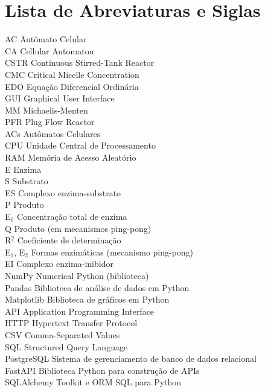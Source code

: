 \documentclass[12pt,oneside]{report}
\begin{document}
\chapter*{Lista de Abreviaturas e Siglas}
\begin{tabbing}
    AC \hspace{2cm} \= Autômato Celular \\
    CA \> Cellular Automaton \\
    CSTR \> Continuous Stirred-Tank Reactor \\
    CMC \> Critical Micelle Concentration \\
    EDO \> Equação Diferencial Ordinária \\
    GUI \> Graphical User Interface \\
    MM \> Michaelis-Menten \\
    PFR \> Plug Flow Reactor \\
    ACs \> Autômatos Celulares \\
    CPU \> Unidade Central de Processamento \\
    RAM \> Memória de Acesso Aleatório \\
    E \> Enzima \\
    S \> Substrato \\
    ES \> Complexo enzima-substrato \\
    P \> Produto \\
    E$_0$ \> Concentração total de enzima \\
    Q \> Produto (em mecanismos ping-pong) \\
    R$^2$ \> Coeficiente de determinação \\
    E$_1$, E$_2$ \> Formas enzimáticas (mecanismo ping-pong) \\
    EI \> Complexo enzima-inibidor \\
    NumPy \> Numerical Python (biblioteca) \\
    Pandas \> Biblioteca de análise de dados em Python \\
    Matplotlib \> Biblioteca de gráficos em Python \\
    API \> Application Programming Interface \\
    HTTP \> Hypertext Transfer Protocol \\
    CSV \> Comma-Separated Values \\
    SQL \> Structured Query Language \\
    PostgreSQL \> Sistema de gerenciamento de banco de dados relacional \\
    FastAPI \> Biblioteca Python para construção de APIs \\
    SQLAlchemy \> Toolkit e ORM SQL para Python \\
\end{tabbing}
\end{document}
